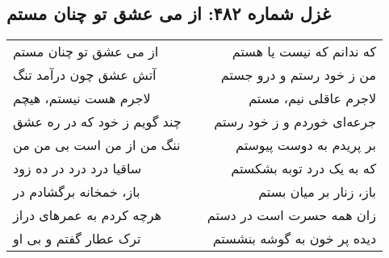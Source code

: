 \begin{center}
\section*{غزل شماره ۴۸۲: از می عشق تو چنان مستم}
\label{sec:482}
\begin{longtable}{l p{0.5cm} r}
از می عشق تو چنان مستم
&&
که ندانم که نیست یا هستم
\\
آتش عشق چون درآمد تنگ
&&
من ز خود رستم و درو جستم
\\
لاجرم هست نیستم، هیچم
&&
لاجرم عاقلی نیم، مستم
\\
چند گویم ز خود که در ره عشق
&&
جرعه‌ای خوردم و ز خود رستم
\\
ننگ من از من است بی من من
&&
بر پریدم به دوست پیوستم
\\
ساقیا درد درد در ده زود
&&
که به یک درد توبه بشکستم
\\
باز، خمخانه برگشادم در
&&
باز، زنار بر میان بستم
\\
هرچه کردم به عمرهای دراز
&&
زان همه حسرت است در دستم
\\
ترک عطار گفتم و بی او
&&
دیده پر خون به گوشه بنشستم
\\
\end{longtable}
\end{center}
